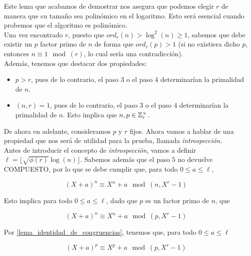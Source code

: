 Este lema que acabamos de demostrar nos asegura que podemos elegir $r$ de manera que su tamaño sea polinómico en el logaritmo. Esto será esencial cuando probemos que el algoritmo es polinómico.\\

Una vez encontrado $r$, puesto que $ord_r(n) > \log^2(n) \geq 1$, sabemos que debe existir un $p$ factor primo de $n$ de forma que $ord_r(p) > 1$ (si no existiera dicho $p$, entonces $n \equiv 1 \mod(r)$, lo cual sería una contradicción).\\

Además, tenemos que destacar dos propiedades:

\begin{itemize}
	\item $p > r$, pues de lo contrario, el paso $3$ o el paso $4$ determinarían la primalidad de $n$.
	
	\item $(n, r) = 1$, pues de lo contrario, el paso $3$ o el paso $4$ determinarían la primalidad de $n$. Esto implica que $n, p \in \mathbb{Z}_r^\times$.
\end{itemize}

De ahora en adelante, consideramos $p$ y $r$ fijos. Ahora vamos a hablar de una propiedad que nos será de utilidad para la prueba, llamada \textit{introspección}.\\

Antes de introducir el concepto de \textit{introspección}, vamos a definir $\ell = \lfloor \sqrt{\phi(r)}\log(n) \rfloor$. Sabemos además que el paso $5$ no devuelve COMPUESTO, por lo que se debe cumplir que, para todo $0 \leq a \leq \ell$,

\begin{equation}\label{identidad_con_polinomio_introspeccion}
(X + a)^n \equiv X^n + a \mod(n, X^r - 1)
\end{equation}

Esto implica para todo $0 \leq a \leq \ell$, dado que $p$ es un factor primo de $n$, que

\begin{equation}\label{identidad_con_polinomio_y_p_introspeccion}
(X + a)^n \equiv X^n + a \mod(p, X^r - 1)
\end{equation}

Por \autoref{lema_identidad_de_congruencias}, tenemos que, para todo $0 \leq a \leq \ell$

\begin{equation}\label{identidad_original_con_p_introspeccion}
(X + a)^p \equiv X^p + a \mod(p, X^r - 1)
\end{equation}

